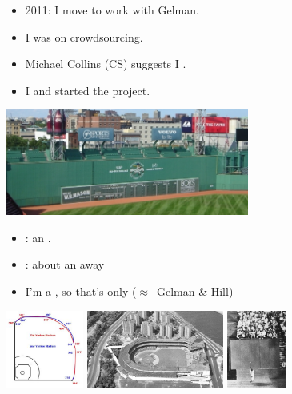 \documentclass[9pt]{report}
\begin{document}
  
\begin{itemize}
\item 2011: I move  to work with 
  Gelman. 
\item I was  on crowdsourcing. 
\item Michael Collins (CS) suggests I .
\item I  and started the  project.
\end{itemize}
\begin{center}
  \spc\includegraphics[width=0.6\textwidth]{img/fenway-fences.jpeg}
\end{center}


  
\begin{itemize}
  \item {}: an .
  \item {}: about an  away
  \item I'm a , so that's only   \hfill   ($\approx$\ Gelman \& Hill) 
  \end{itemize}
\vfill
\begin{center}
  \spc
  \includegraphics[height=1in]{img/yankee-stadium.jpeg}
  \hfill
  \spc\includegraphics[height=1in]{img/polo-grounds.jpeg}
  \hfill
  \spc\includegraphics[height=1in]{img/willie-mays.jpeg}
\end{center}
\end{document}
